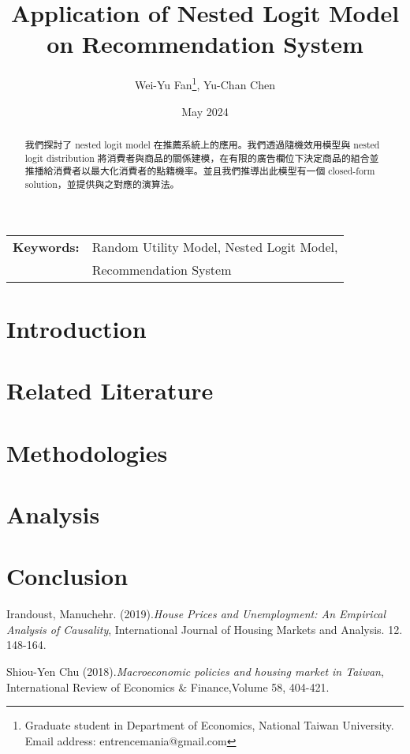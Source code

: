 \documentclass[12pt]{article}
\title{Application of Nested Logit Model on Recommendation System}
\author{Wei-Yu Fan\thanks{
Graduate student in Department of Economics, National Taiwan University.\\ 
Email address: entrencemania@gmail.com
}, Yu-Chan Chen
}
\date{May 2024}
\begin{document}
\maketitle
\begin{spacing}{0}
\begin{abstract}\noindent
我們探討了 nested logit model 在推薦系統上的應用。我們透過隨機效用模型與 nested logit distribution 將消費者與商品的關係建模，在有限的廣告欄位下決定商品的組合並推播給消費者以最大化消費者的點籍機率。並且我們推導出此模型有一個 closed-form solution，並提供與之對應的演算法。
\end{abstract}
\end{spacing}
\begin{tabular}{rl}
\\
\textbf{Keywords:} &Random Utility Model, Nested Logit Model, \\
&Recommendation System
\end{tabular}

\newpage


\section{Introduction}

\section{Related Literature}

\section{Methodologies}

\section{Analysis}

\section{Conclusion}

\begin{thebibliography}{1}
    Irandoust, Manuchehr. (2019).\emph{House Prices and Unemployment: An Empirical Analysis of Causality},
    International Journal of Housing Markets and Analysis. 12. 148-164. 

    Shiou-Yen Chu (2018).\emph{Macroeconomic policies and housing market in Taiwan},
    International Review of Economics \& Finance,Volume 58, 404-421.
\end{thebibliography}
\end{document}
